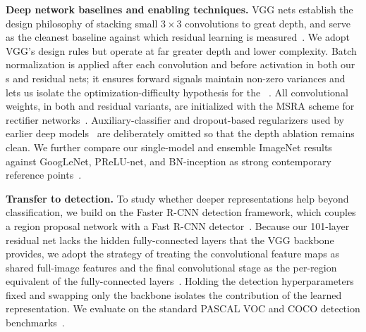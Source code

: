 \noindent\textbf{Deep network baselines and enabling techniques.}
VGG nets establish the design philosophy of stacking small $3\times3$
convolutions to great depth, and serve as the cleanest \plainnet{} baseline
against which residual learning is measured~\cite{vgg2015}. We adopt VGG's
design rules but operate at far greater depth and lower
complexity. Batch normalization is applied after each convolution and before
activation in both our \plainnet{}s and residual nets; it ensures forward
signals maintain non-zero variances and lets us isolate the
optimization-difficulty hypothesis for the \degrad{}~\cite{bn2015}. All
convolutional weights, in both \plainnet{} and residual variants, are
initialized with the MSRA scheme for rectifier
networks~\cite{msra2015}. Auxiliary-classifier and dropout-based regularizers
used by earlier deep models~\cite{dsn2014,dropout2012} are deliberately omitted
so that the depth ablation remains clean. We further compare our single-model
and ensemble ImageNet results against GoogLeNet, PReLU-net, and BN-inception as
strong contemporary reference points~\cite{googlenet2015,msra2015,bn2015}.

\noindent\textbf{Transfer to detection.}
To study whether deeper representations help beyond classification, we build on
the Faster R-CNN detection framework, which couples a region proposal network
with a Fast R-CNN detector~\cite{fasterrcnn2015,fastrcnn2015,rcnn2014}. Because
our 101-layer residual net lacks the hidden fully-connected layers that the VGG
backbone provides, we adopt the strategy of treating the convolutional feature
maps as shared full-image features and the final convolutional stage as the
per-region equivalent of the fully-connected
layers~\cite{noc2015,spp2014}. Holding the detection hyperparameters fixed and
swapping only the backbone isolates the contribution of the learned
representation. We evaluate on the standard PASCAL VOC and COCO detection
benchmarks~\cite{pascalvoc2010,coco2014,imagenet2015}.
